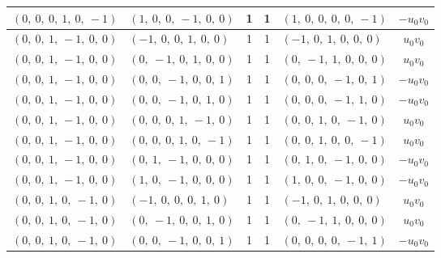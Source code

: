 \documentclass[11pt]{article}
\theoremstyle{definition}
\begin{document}
\begin{longtable}{|l|l|c|c|l|c|}
    \hline
    $\left( 0, \  0, \  0, \  1, \  0, \  -1\right)$ & $\left( 1, \  0, \  0, \  -1, \  0, \  0\right)$ & 1 & 1 & $\left( 1, \  0, \  0, \  0, \  0, \  -1\right)$ & $- u_{0} v_{0}$ \\
    \hline
    $\left( 0, \  0, \  1, \  -1, \  0, \  0\right)$ & $\left( -1, \  0, \  0, \  1, \  0, \  0\right)$ & 1 & 1 & $\left( -1, \  0, \  1, \  0, \  0, \  0\right)$ & $u_{0} v_{0}$ \\
    \hline
    $\left( 0, \  0, \  1, \  -1, \  0, \  0\right)$ & $\left( 0, \  -1, \  0, \  1, \  0, \  0\right)$ & 1 & 1 & $\left( 0, \  -1, \  1, \  0, \  0, \  0\right)$ & $u_{0} v_{0}$ \\
    \hline
    $\left( 0, \  0, \  1, \  -1, \  0, \  0\right)$ & $\left( 0, \  0, \  -1, \  0, \  0, \  1\right)$ & 1 & 1 & $\left( 0, \  0, \  0, \  -1, \  0, \  1\right)$ & $- u_{0} v_{0}$ \\
    \hline
    $\left( 0, \  0, \  1, \  -1, \  0, \  0\right)$ & $\left( 0, \  0, \  -1, \  0, \  1, \  0\right)$ & 1 & 1 & $\left( 0, \  0, \  0, \  -1, \  1, \  0\right)$ & $- u_{0} v_{0}$ \\
    \hline
    $\left( 0, \  0, \  1, \  -1, \  0, \  0\right)$ & $\left( 0, \  0, \  0, \  1, \  -1, \  0\right)$ & 1 & 1 & $\left( 0, \  0, \  1, \  0, \  -1, \  0\right)$ & $u_{0} v_{0}$ \\
    \hline
    $\left( 0, \  0, \  1, \  -1, \  0, \  0\right)$ & $\left( 0, \  0, \  0, \  1, \  0, \  -1\right)$ & 1 & 1 & $\left( 0, \  0, \  1, \  0, \  0, \  -1\right)$ & $u_{0} v_{0}$ \\
    \hline
    $\left( 0, \  0, \  1, \  -1, \  0, \  0\right)$ & $\left( 0, \  1, \  -1, \  0, \  0, \  0\right)$ & 1 & 1 & $\left( 0, \  1, \  0, \  -1, \  0, \  0\right)$ & $- u_{0} v_{0}$ \\
    \hline
    $\left( 0, \  0, \  1, \  -1, \  0, \  0\right)$ & $\left( 1, \  0, \  -1, \  0, \  0, \  0\right)$ & 1 & 1 & $\left( 1, \  0, \  0, \  -1, \  0, \  0\right)$ & $- u_{0} v_{0}$ \\
    \hline
    $\left( 0, \  0, \  1, \  0, \  -1, \  0\right)$ & $\left( -1, \  0, \  0, \  0, \  1, \  0\right)$ & 1 & 1 & $\left( -1, \  0, \  1, \  0, \  0, \  0\right)$ & $u_{0} v_{0}$ \\
    \hline
    $\left( 0, \  0, \  1, \  0, \  -1, \  0\right)$ & $\left( 0, \  -1, \  0, \  0, \  1, \  0\right)$ & 1 & 1 & $\left( 0, \  -1, \  1, \  0, \  0, \  0\right)$ & $u_{0} v_{0}$ \\
    \hline
    $\left( 0, \  0, \  1, \  0, \  -1, \  0\right)$ & $\left( 0, \  0, \  -1, \  0, \  0, \  1\right)$ & 1 & 1 & $\left( 0, \  0, \  0, \  0, \  -1, \  1\right)$ & $- u_{0} v_{0}$ \\

\end{longtable}
\end{document}
